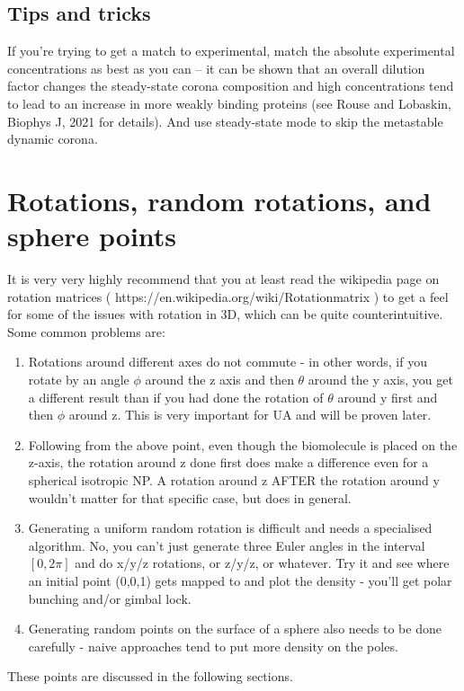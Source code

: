 \documentclass[10pt,a4paper,onecolumn]{report}
\begin{document}
\section{Tips and tricks}
If you're trying to get a match to experimental, match the absolute experimental concentrations as best as you can -- it can be shown that an overall dilution factor changes the steady-state corona composition and high concentrations tend to lead to an increase in more weakly binding proteins (see Rouse and Lobaskin, Biophys J, 2021 for details).  And use steady-state mode to skip the metastable dynamic corona.
 
 
\appendix
\chapter{Rotations, random rotations, and sphere points}
 It is very very highly recommend that you at least read the wikipedia page on rotation matrices ( https:\slash \slash en.wikipedia.org\slash wiki\slash Rotation\textunderscore matrix ) to get a feel for some of the issues with rotation in 3D, which can be quite counterintuitive. Some common problems are:
\begin{enumerate}
\item Rotations around different axes do not commute - in other words, if you rotate by an angle $\phi$ around the z axis and then $\theta$ around the y axis, you get a different result than if you had done the rotation of $\theta$ around y first and then $\phi$ around z. This is very important for UA and will be proven later. 
\item Following from the above point, even though the biomolecule is placed on the z-axis, the rotation around z done first does make a difference even for a spherical isotropic NP. A rotation around z AFTER the rotation around y wouldn't matter for that specific case, but does in general. 
\item Generating a uniform random rotation is difficult and needs a specialised algorithm. No, you can't just generate three Euler angles in the interval $[0,2\pi]$ and do x/y/z rotations, or z/y/z, or whatever. Try it and see where an initial point (0,0,1) gets mapped to and plot the density - you'll get polar bunching and/or gimbal lock. 
\item Generating random points on the surface of a sphere also needs to be done carefully - naive approaches tend to put more density on the poles.
\end{enumerate}
These points are discussed in the following sections.
\end{document}
